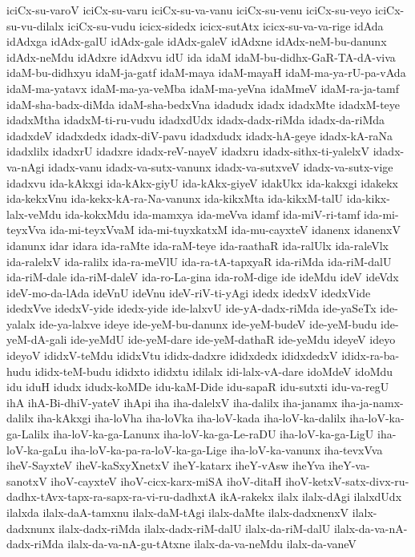 {iciCx-su-varoV
iciCx-su-varu
iciCx-su-va-vanu
iciCx-su-venu
iciCx-su-veyo
iciCx-su-vu-dilalx
iciCx-su-vudu
icicx-sidedx
icicx-sutAtx
icicx-su-va-va-rige
idAda
idAdxga
idAdx-galU
idAdx-gale
idAdx-galeV
idAdxne
idAdx-neM-bu-danunx
idAdx-neMdu
idAdxre
idAdxvu
idU
ida
idaM
idaM-bu-didhx-GaR-TA-dA-viva
idaM-bu-didhxyu
idaM-ja-gatf
idaM-maya
idaM-mayaH
idaM-ma-ya-rU-pa-vAda
idaM-ma-yatavx
idaM-ma-ya-veMba
idaM-ma-yeVna
idaMmeV
idaM-ra-ja-tamf
idaM-sha-badx-diMda
idaM-sha-bedxVna
idadudx
idadx
idadxMte
idadxM-teye
idadxMtha
idadxM-ti-ru-vudu
idadxdUdx
idadx-dadx-riMda
idadx-da-riMda
idadxdeV
idadxdedx
idadx-diV-pavu
idadxdudx
idadx-hA-geye
idadx-kA-raNa
idadxlilx
idadxrU
idadxre
idadx-reV-nayeV
idadxru
idadx-sithx-ti-yalelxV
idadx-va-nAgi
idadx-vanu
idadx-va-sutx-vanunx
idadx-va-sutxveV
idadx-va-sutx-vige
idadxvu
ida-kAkxgi
ida-kAkx-giyU
ida-kAkx-giyeV
idakUkx
ida-kakxgi
idakekx
ida-kekxVnu
ida-kekx-kA-ra-Na-vanunx
ida-kikxMta
ida-kikxM-talU
ida-kikx-lalx-veMdu
ida-kokxMdu
ida-mamxya
ida-meVva
idamf
ida-miV-ri-tamf
ida-mi-teyxVva
ida-mi-teyxVvaM
ida-mi-tuyxkatxM
ida-mu-cayxteV
idanenx
idanenxV
idanunx
idar
idara
ida-raMte
ida-raM-teye
ida-raathaR
ida-ralUlx
ida-raleVlx
ida-ralelxV
ida-ralilx
ida-ra-meVlU
ida-ra-tA-tapxyaR
ida-riMda
ida-riM-dalU
ida-riM-dale
ida-riM-daleV
ida-ro-La-gina
ida-roM-dige
ide
ideMdu
ideV
ideVdx
ideV-mo-da-lAda
ideVnU
ideVnu
ideV-riV-ti-yAgi
idedx
idedxV
idedxVide
idedxVve
idedxV-yide
idedx-yide
ide-lalxvU
ide-yA-dadx-riMda
ide-yaSeTx
ide-yalalx
ide-ya-lalxve
ideye
ide-yeM-bu-danunx
ide-yeM-budeV
ide-yeM-budu
ide-yeM-dA-gali
ide-yeMdU
ide-yeM-dare
ide-yeM-dathaR
ide-yeMdu
ideyeV
ideyo
ideyoV
ididxV-teMdu
ididxVtu
ididx-dadxre
ididxdedx
ididxdedxV
ididx-ra-ba-hudu
ididx-teM-budu
ididxto
ididxtu
idilalx
idi-lalx-vA-dare
idoMdeV
idoMdu
idu
iduH
idudx
idudx-koMDe
idu-kaM-Dide
idu-sapaR
idu-sutxti
idu-va-regU
ihA
ihA-Bi-dhiV-yateV
ihApi
iha
iha-dalelxV
iha-dalilx
iha-janamx
iha-ja-namx-dalilx
iha-kAkxgi
iha-loVha
iha-loVka
iha-loV-kada
iha-loV-ka-dalilx
iha-loV-ka-ga-Lalilx
iha-loV-ka-ga-Lanunx
iha-loV-ka-ga-Le-raDU
iha-loV-ka-ga-LigU
iha-loV-ka-gaLu
iha-loV-ka-pa-ra-loV-ka-ga-Lige
iha-loV-ka-vanunx
iha-tevxVva
iheV-SayxteV
iheV-kaSxyXnetxV
iheY-katarx
iheY-vAsw
iheYva
iheY-va-sanotxV
ihoV-cayxteV
ihoV-cicx-karx-miSA
ihoV-ditaH
ihoV-ketxV-satx-divx-ru-dadhx-tAvx-tapx-ra-sapx-ra-vi-ru-dadhxtA
ikA-rakekx
ilalx
ilalx-dAgi
ilalxdUdx
ilalxda
ilalx-daA-tamxnu
ilalx-daM-tAgi
ilalx-daMte
ilalx-dadxnenxV
ilalx-dadxnunx
ilalx-dadx-riMda
ilalx-dadx-riM-dalU
ilalx-da-riM-dalU
ilalx-da-va-nA-dadx-riMda
ilalx-da-va-nA-gu-tAtxne
ilalx-da-va-neMdu
ilalx-da-vaneV
}
